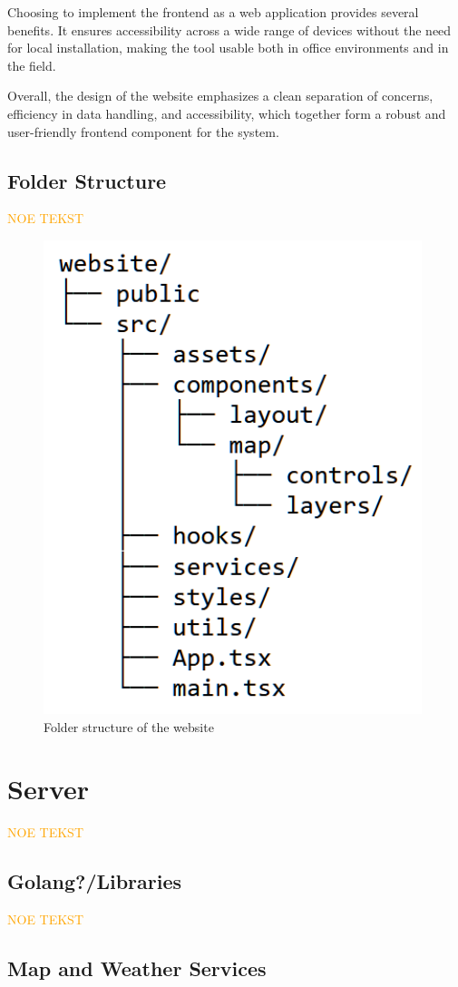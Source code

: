 Choosing to implement the frontend as a web application provides several benefits. It ensures accessibility across a wide range of devices without the need for local installation, making the tool usable both in office environments and in the field.

Overall, the design of the website emphasizes a clean separation of concerns, efficiency in data handling, and accessibility, which together form a robust and user-friendly frontend component for the system.




\subsection{Folder Structure}

\textcolor{orange}{NOE TEKST}
\begin{figure}[h]
    \centering
    \includegraphics[width=0.5\linewidth]{figures/website_folder_structure.pdf}
    \caption{Folder structure of the website}
    \label{fig:website_folder_structure}
\end{figure}

\section{Server}

\textcolor{orange}{NOE TEKST}

\subsection{Golang?/Libraries}

\textcolor{orange}{NOE TEKST}

\subsection{Map and Weather Services} %

